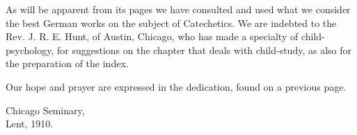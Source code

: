 As will be apparent from its pages we have consulted and used what we consider the best German works on the subject of Catechetics. We are indebted to the Rev. J. R. E. Hunt, of Austin, Chicago, who has made a specialty of child-psychology, for suggestions on the chapter that deals with child-study, as also for the preparation of the index.

Our hope and prayer are expressed in the dedication, found on a previous page.

\begin{unterschrift}
Chicago Seminary,\\
Lent, 1910.
\end{unterschrift}
